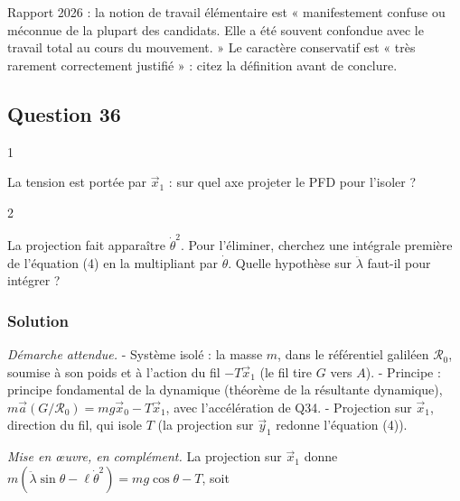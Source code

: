 \documentclass[11pt,a4paper]{article}
\newcommand{\equationajustee}[1]{%
  \sbox{\boiteequation}{$\displaystyle #1$}%
  \ifdim\wd\boiteequation>\linewidth
    \[\resizebox{\linewidth}{!}{\usebox{\boiteequation}}\]%
  \else
    \[#1\]%
  \fi}
\begin{document}
\begin{jury}

Rapport 2026 : la notion de travail élémentaire est « manifestement confuse ou méconnue de la plupart des candidats. Elle a été souvent confondue avec le travail total au cours du mouvement. » Le caractère conservatif est « très rarement correctement justifié » : citez la définition avant de conclure.

\end{jury}

\hypertarget{question-36}{%
\subsection{Question 36}\label{question-36}}

\begin{indication}{1}

La tension est portée par \(\vec x_1\) : sur quel axe projeter le PFD pour l'isoler ?

\end{indication}

\begin{indication}{2}

La projection fait apparaître \(\dot\theta^2\). Pour l'éliminer, cherchez une intégrale première de l'équation (4) en la multipliant par \(\dot\theta\). Quelle hypothèse sur \(\ddot\lambda\) faut-il pour intégrer ?

\end{indication}

\hypertarget{solution-35}{%
\subsubsection{Solution}\label{solution-35}}

\emph{Démarche attendue.}
- Système isolé : la masse \(m\), dans le référentiel galiléen \(\mathcal R_0\), soumise à son poids et à l'action du fil \(-T\vec x_1\) (le fil tire \(G\) vers \(A\)).
- Principe : principe fondamental de la dynamique (théorème de la résultante dynamique), \(m\vec a(G/\mathcal R_0)=mg\vec x_0-T\vec x_1\), avec l'accélération de Q34.
- Projection sur \(\vec x_1\), direction du fil, qui isole \(T\) (la projection sur \(\vec y_1\) redonne l'équation (4)).

\emph{Mise en œuvre, en complément.} La projection sur \(\vec x_1\) donne \(m(\ddot\lambda\sin\theta-\ell\dot\theta^2)=mg\cos\theta-T\), soit

\equationajustee{T=m\big(g\cos\theta+\ell\dot\theta^2-\ddot\lambda\sin\theta\big).}
\end{document}
